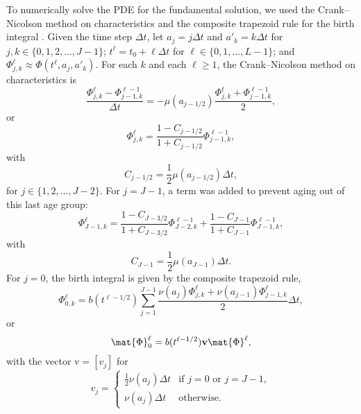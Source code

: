 \documentclass{jpmarticle}
\renewcommand{\vec}[1]{\boldsymbol{\mathrm{#1}}}
\begin{document}
To numerically solve the PDE for the fundamental solution, we used the
Crank--Nicolson method on characteristics and the composite trapezoid
rule for the birth integral \autocite{milner_1992}.  Given the time
step $\Delta t$, let $a_j = j \Delta t$ and $a'_k = k \Delta t$ for
$j, k \in \{0, 1, 2, \ldots, J - 1\}$;
$t^{\ell} = t_0 + \ell \Delta t$ for
$\ell \in \{0, 1, \ldots, L - 1\}$;
and $\Phi_{j, k}^{\ell} \approx \Phi(t^{\ell}, a_j, a'_k)$.
For each $k$ and each $\ell \geq 1$, the Crank--Nicolson
method on characteristics is
\begin{equation}
  \label{CN_step}
  \frac{\Phi_{j, k}^{\ell} - \Phi_{j - 1, k}^{\ell - 1}}{\Delta t}
  = - \mu(a_{j - 1 / 2})
  \frac{\Phi_{j, k}^{\ell} + \Phi_{j - 1, k}^{\ell - 1}}{2},
\end{equation}
or
\begin{equation}
  \Phi_{j, k}^{\ell}
  = \frac{1 - C_{j - 1 / 2}}{1 + C_{j - 1 / 2}}
  \Phi_{j - 1, k}^{\ell - 1},
\end{equation}
with
\begin{equation}
  C_{j - 1 / 2}
  = \frac{1}{2} \mu(a_{j - 1 / 2}) \Delta t,
\end{equation}
for $j \in \{1, 2, \ldots, J - 2\}$.  For $j = J - 1$,
a term was added to prevent aging out of this
last age group:
\begin{equation}
  \Phi_{J - 1, k}^{\ell}
  = \frac{1 - C_{J - 3 / 2}}{1 + C_{J - 3 / 2}}
  \Phi_{J - 2, k}^{\ell - 1}
  + \frac{1 - C_{J - 1}}{1 + C_{J - 1}}
  \Phi_{J - 1, k}^{\ell - 1},
\end{equation}
with
\begin{equation}
  C_{J - 1}
  = \frac{1}{2} \mu(a_{J - 1}) \Delta t.
\end{equation}
For $j = 0$, the birth integral is given by the composite trapezoid
rule,
\begin{equation}
  \label{birth_step}
  \Phi_{0, k}^{\ell} =
  b(t^{\ell - 1 / 2})
  \sum_{j = 1}^{J - 1}
  \frac{\nu(a_j) \Phi_{j, k}^{\ell}
    + \nu(a_{j - 1}) \Phi_{j - 1, k}^{\ell}}{2}
  \Delta t,
\end{equation}
or
\begin{equation}
  \mat{\Phi}_0^{\ell} = b(t^{\ell - 1 / 2}) \vec{v} \mat{\Phi}^{\ell},
\end{equation}
with the vector $\vec{v} = [v_j]$ for
\begin{equation}
  v_j =
  \begin{cases}
    \frac{1}{2} \nu(a_j) \Delta t
    & \text{if $j = 0$ or $j = J - 1$}, \\
    \nu(a_j) \Delta t
    & \text{otherwise}.
  \end{cases}
\end{equation}
\end{document}
